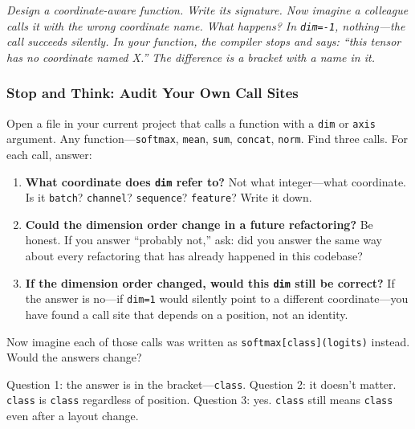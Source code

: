 \documentclass[11pt,titlepage]{article}
\begin{document}
\vspace{2em}

\emph{Design a coordinate-aware function. Write its signature. Now
imagine a colleague calls it with the wrong coordinate name. What
happens? In \texttt{dim=-1}, nothing---the call succeeds silently. In
your function, the compiler stops and says: ``this tensor has no
coordinate named X.'' The difference is a bracket with a name in it.}

\vspace{2em}

\hypertarget{stop-and-think-audit-your-own-call-sites}{%
\subsubsection{Stop and Think: Audit Your Own Call
Sites}\label{stop-and-think-audit-your-own-call-sites}}

Open a file in your current project that calls a function with a
\texttt{dim} or \texttt{axis} argument. Any function---\texttt{softmax},
\texttt{mean}, \texttt{sum}, \texttt{concat}, \texttt{norm}. Find three
calls. For each call, answer:

\begin{enumerate}
\def\labelenumi{\arabic{enumi}.}
\item
  \textbf{What coordinate does \texttt{dim} refer to?} Not what
  integer---what coordinate. Is it \texttt{batch}? \texttt{channel}?
  \texttt{sequence}? \texttt{feature}? Write it down.
\item
  \textbf{Could the dimension order change in a future refactoring?} Be
  honest. If you answer ``probably not,'' ask: did you answer the same
  way about every refactoring that has already happened in this
  codebase?
\item
  \textbf{If the dimension order changed, would this \texttt{dim} still
  be correct?} If the answer is no---if \texttt{dim=1} would silently
  point to a different coordinate---you have found a call site that
  depends on a position, not an identity.
\end{enumerate}

Now imagine each of those calls was written as
\texttt{softmax{[}class{]}(logits)} instead. Would the answers change?

Question 1: the answer is in the bracket---\texttt{class}. Question 2:
it doesn't matter. \texttt{class} is \texttt{class} regardless of
position. Question 3: yes. \texttt{class} still means \texttt{class}
even after a layout change.
\end{document}
